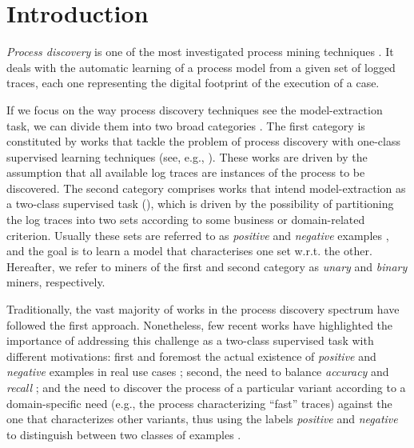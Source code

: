 

\section{Introduction}
\label{sec:introduction}

\emph{Process discovery} is one of the most investigated process mining techniques \cite{2012-Aalst}. It deals with the automatic learning of a process model from a given set of logged traces, each one representing the digital footprint of the execution of a case.

If we focus on the way process discovery techniques see the model-extraction task, we can divide them into two broad categories \cite{2018-Ponce,DBLP:conf/bpm/SlaatsDB21}. The first category is constituted by works that tackle the problem of process discovery with one-class supervised learning techniques (see, e.g., \cite{2010-Aalst,2004-Aalst,2007-Gunther,2003-Weijters}). These works are driven by the assumption that all available log traces are instances of the process to be discovered. The second category comprises works that intend model-extraction as a two-class supervised task (\cite{2009-Chesani,2009-Goedertier,2006-Maruster}), which is driven by the possibility of partitioning the log traces into two sets according to some business or domain-related criterion. Usually these sets are referred to as \emph{positive} and \emph{negative} examples \cite{2018-Ponce,DBLP:conf/bpm/SlaatsDB21}, and the goal is to learn a model that characterises one set w.r.t. the other. Hereafter, we refer to miners of the first and second category as \emph{unary} and \emph{binary} miners, respectively. 

Traditionally, the vast majority of works in the process discovery spectrum have followed the first approach. Nonetheless, few recent works \cite{deviant-tkde,2018-Ponce,DBLP:conf/bpm/SlaatsDB21} have highlighted the importance of addressing this challenge as a two-class supervised task with different motivations: first and foremost the actual existence of \emph{positive} and \emph{negative} examples in real use cases \cite{2018-Ponce,DBLP:conf/bpm/SlaatsDB21}; second, the need to balance \emph{accuracy} and \emph{recall} \cite{DBLP:conf/bpm/SlaatsDB21}; and  the need to discover the process of a particular variant according to a domain-specific need (e.g., the process characterizing ``fast'' traces) against the one that characterizes other variants, thus using the labels \emph{positive} and \emph{negative} to distinguish between two classes of examples \cite{deviant-tkde}.  

